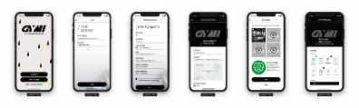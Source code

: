 \begin{figure}[H]
	\centering
    \includegraphics[width=0.14\textwidth]{pfc/figuras/landing.png}
    \includegraphics[width=0.14\textwidth]{pfc/figuras/login.png}
    \includegraphics[width=0.14\textwidth]{pfc/figuras/register-manager.png}
    \includegraphics[width=0.14\textwidth]{pfc/figuras/register-gym-info.png}
    \includegraphics[width=0.14\textwidth]{pfc/figuras/register-gym-photos.png}
    \includegraphics[width=0.14\textwidth]{pfc/figuras/register-gym-amenities.png}

\end{figure}
